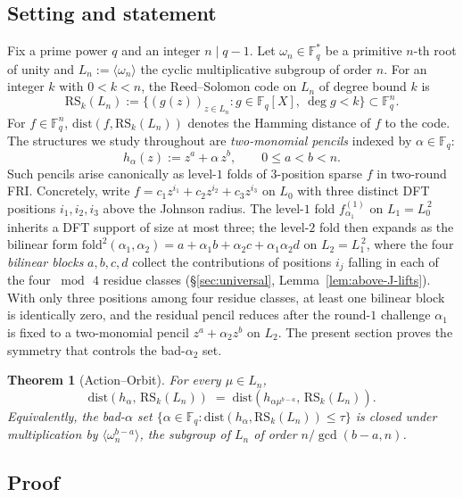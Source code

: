 \documentclass[11pt]{article}
\newtheorem{theorem}{Theorem}[section]
\theoremstyle{definition}
\theoremstyle{remark}
\newcommand{\FF}{\mathbb{F}}
\newcommand{\RS}{\mathrm{RS}}
\newcommand{\dist}{\mathrm{dist}}
\begin{document}
\subsection{Setting and statement}

Fix a prime power $q$ and an integer $n \mid q-1$. Let $\omega_n \in \FF_q^*$
be a primitive $n$-th root of unity and $L_n := \langle \omega_n \rangle$ the
cyclic multiplicative subgroup of order $n$. For an integer $k$ with
$0 < k < n$, the Reed--Solomon code on $L_n$ of degree bound $k$ is
\[
\RS_k(L_n) := \{(g(z))_{z \in L_n} : g \in \FF_q[X],\ \deg g < k\} \subset \FF_q^{n}.
\]
For $f \in \FF_q^{n}$, $\dist(f, \RS_k(L_n))$ denotes the Hamming distance
of $f$ to the code. The structures we study throughout are \emph{two-monomial
pencils} indexed by $\alpha \in \FF_q$:
\[
h_\alpha(z) := z^a + \alpha\, z^b, \qquad 0 \leq a < b < n.
\]
Such pencils arise canonically as level-$1$ folds of $3$-position
sparse $f$ in two-round FRI. Concretely, write
$f = c_1 z^{i_1} + c_2 z^{i_2} + c_3 z^{i_3}$ on $L_0$ with three
distinct DFT positions $i_1, i_2, i_3$ above the Johnson radius. The
level-$1$ fold $f^{(1)}_{\alpha_1}$ on $L_1 = L_0^{\,2}$ inherits a
DFT support of size at most three; the level-$2$ fold then expands as
the bilinear form
$\mathrm{fold}^2(\alpha_1, \alpha_2) = a + \alpha_1 b + \alpha_2 c +
\alpha_1\alpha_2 d$ on $L_2 = L_1^{\,2}$, where the four
\emph{bilinear blocks} $a, b, c, d$ collect the contributions of
positions $i_j$ falling in each of the four $\bmod\,4$ residue
classes (\S\ref{sec:universal}, Lemma~\ref{lem:above-J-lifts}). With
only three positions among four residue classes, at least one
bilinear block is identically zero, and the residual pencil reduces
after the round-$1$ challenge $\alpha_1$ is fixed to a two-monomial
pencil $z^a + \alpha_2 z^b$ on $L_2$. The present section proves the
symmetry that controls the bad-$\alpha_2$ set.

\begin{theorem}[Action--Orbit]
\label{thm:action-orbit}
For every $\mu \in L_n$,
\[
 \dist(h_\alpha,\, \RS_k(L_n)) \;=\; \dist(h_{\alpha \mu^{b-a}},\, \RS_k(L_n)).
\]
Equivalently, the bad-$\alpha$ set
$\{\alpha \in \FF_q : \dist(h_\alpha, \RS_k(L_n)) \leq \tau\}$ is closed
under multiplication by $\langle\omega_n^{b-a}\rangle$, the subgroup of
$L_n$ of order $n / \gcd(b-a, n)$.
\end{theorem}

\subsection{Proof}
\end{document}

